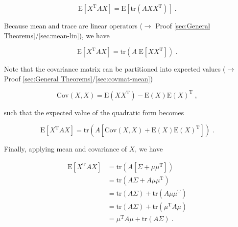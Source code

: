 \documentclass[a4paper,12pt,twoside]{book}
\begin{document}
\begin{equation} \label{eq:mean-qf-mean-qf-s2}
\mathrm{E}\left[ X^\mathrm{T} A X \right] =  \mathrm{E}\left[ \mathrm{tr} \left( A X X^\mathrm{T} \right) \right] \; .
\end{equation}

Because mean and trace are linear operators ($\rightarrow$ Proof \ref{sec:General Theorems}/\ref{sec:mean-lin}), we have

\begin{equation} \label{eq:mean-qf-mean-qf-s3}
\mathrm{E}\left[ X^\mathrm{T} A X \right] =  \mathrm{tr} \left( A \; \mathrm{E}\left[ X X^\mathrm{T} \right] \right) \; .
\end{equation}

Note that the covariance matrix can be partitioned into expected values ($\rightarrow$ Proof \ref{sec:General Theorems}/\ref{sec:covmat-mean})

\begin{equation} \label{eq:mean-qf-covmat-mean}
\mathrm{Cov}(X,X) = \mathrm{E}(X X^\mathrm{T}) - \mathrm{E}(X) \mathrm{E}(X)^\mathrm{T} \; ,
\end{equation}

such that the expected value of the quadratic form becomes

\begin{equation} \label{eq:mean-qf-mean-qf-s4}
\mathrm{E}\left[ X^\mathrm{T} A X \right] =  \mathrm{tr} \left( A \left[ \mathrm{Cov}(X,X) + \mathrm{E}(X) \mathrm{E}(X)^\mathrm{T} \right] \right) \; .
\end{equation}

Finally, applying mean and covariance of $X$, we have

\begin{equation} \label{eq:mean-qf-mean-qf-s5}
\begin{split}
\mathrm{E}\left[ X^\mathrm{T} A X \right] &= \mathrm{tr} \left( A \left[ \Sigma + \mu \mu^\mathrm{T} \right] \right) \\
&= \mathrm{tr} \left( A \Sigma + A \mu \mu^\mathrm{T} \right) \\
&= \mathrm{tr}(A \Sigma) + \mathrm{tr}(A \mu \mu^\mathrm{T}) \\
&= \mathrm{tr}(A \Sigma) + \mathrm{tr}(\mu^\mathrm{T} A \mu) \\
&= \mu^\mathrm{T} A \mu + \mathrm{tr}(A \Sigma) \; .
\end{split}
\end{equation}
\end{document}

